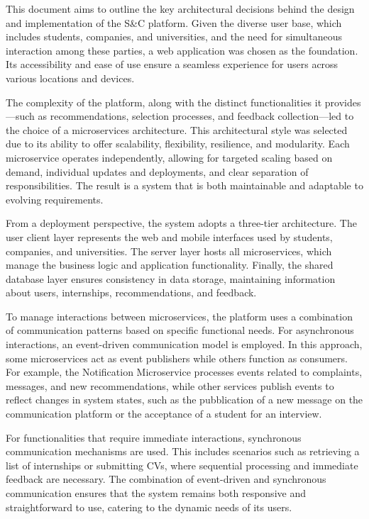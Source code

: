 This document aims to outline the key architectural decisions behind the design and implementation of
the S\&C platform. Given the diverse user base, which includes students, companies, and universities,
and the need for simultaneous interaction among these parties, a web application was chosen as the
foundation. Its accessibility and ease of use ensure a seamless experience for users across various
locations and devices.

The complexity of the platform, along with the distinct functionalities it provides—such as recommendations,
selection processes, and feedback collection—led to the choice of a microservices architecture.
This architectural style was selected due to its ability to offer scalability, flexibility, resilience,
and modularity. Each microservice operates independently, allowing for targeted scaling based on
demand, individual updates and deployments, and clear separation of responsibilities.
The result is a system that is both maintainable and adaptable to evolving requirements.

From a deployment perspective, the system adopts a three-tier architecture. The user client
layer represents the web and mobile interfaces used by students, companies, and universities.
The server layer hosts all microservices, which manage the business logic and application
functionality. Finally, the shared database layer ensures consistency in data storage,
maintaining information about users, internships, recommendations, and feedback.

To manage interactions between microservices, the platform uses a combination of communication
patterns based on specific functional needs. For asynchronous interactions, an
event-driven communication model is employed. In this approach, some microservices act as event
publishers while others function as consumers. For example, the Notification Microservice processes
events related to complaints, messages, and new recommendations, while other services publish events
to reflect changes in system states, such as the pubblication of a new message on the communication platform
or the acceptance of a student for an interview.
 
For functionalities that require immediate interactions, synchronous communication mechanisms
are used. This includes scenarios such as retrieving a list of internships or submitting CVs, where
sequential processing and immediate feedback are necessary. The combination of event-driven and
synchronous communication ensures that the system remains both responsive and straightforward to
use, catering to the dynamic needs of its users.


